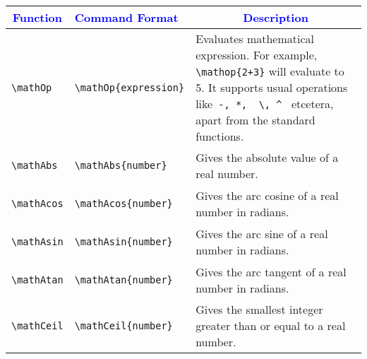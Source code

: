 \documentclass{article}
\begin{document}
\begin{center}
\begin{longtable}{llm{6cm}}
\toprule
\multicolumn{1}{c}{\textcolor{blue}{Function}} & \multicolumn{1}{l}{\textcolor{blue}{Command Format}} & \multicolumn{1}{c}{\textcolor{blue}{Description}}  \\
\toprule
\begin{lstlisting}
\mathOp
\end{lstlisting} &
\begin{lstlisting}
\mathOp{expression}
\end{lstlisting} & Evaluates mathematical expression. For example, \lstinline|\mathop{2+3}| will evaluate to 5. It supports usual operations like\lstinline| -, *,  \, ^ | etcetera, apart from the standard functions. \\
\midrule
\begin{lstlisting}
\mathAbs
\end{lstlisting} &
\begin{lstlisting}
\mathAbs{number}
\end{lstlisting} & Gives the absolute value of a real number.\\
\midrule
\begin{lstlisting}
\mathAcos
\end{lstlisting} &
\begin{lstlisting}
\mathAcos{number}
\end{lstlisting} & Gives the arc cosine of a real number in radians.\\
\midrule
\begin{lstlisting}
\mathAsin
\end{lstlisting} &
\begin{lstlisting}
\mathAsin{number}
\end{lstlisting} & Gives the arc sine of a real number in radians.\\
\midrule
\begin{lstlisting}
\mathAtan
\end{lstlisting} &
\begin{lstlisting}
\mathAtan{number}
\end{lstlisting} & Gives the arc tangent of a real number in radians.\\
\midrule
\begin{lstlisting}
\mathCeil
\end{lstlisting} &
\begin{lstlisting}
\mathCeil{number}
\end{lstlisting} & Gives the smallest integer greater than or equal to a real number.\\

\end{longtable}
\end{center}
\end{document}
